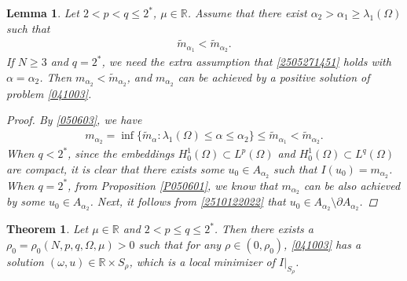 \documentclass[10pt,a4paper]{amsart}
\newtheorem{theorem}{Theorem}
\newtheorem{lemma}{Lemma}
\begin{document}
\begin{lemma}\label{L050602}
Let $2<p<q\le 2^*$, $\mu\in \mathbb{R}$. Assume that there exist $\alpha_2>\alpha_1\ge\lambda_1(\Omega)$ such that 
\begin{equation}\label{050603}
\begin{aligned}
 \widetilde{m}_{\alpha_1}<\widetilde{m}_{\alpha_2}.
\end{aligned}
\end{equation}
If $N\ge 3$ and $q=2^*$, we need the extra assumption that \eqref{2505271451} holds with $\alpha= \alpha_2$. Then $m_{\alpha_2}<\widetilde{m}_{\alpha_2}$, and $m_{\alpha_2}$ can be achieved by a positive solution of problem \eqref{041003}.
\begin{proof}
By \eqref{050603}, we have
\begin{equation}\label{2510122022}
\begin{aligned}
m_{\alpha_2} = \inf\{\widetilde{m}_{\alpha}:\lambda_1(\Omega)\leq \alpha \leq \alpha_2\}
\leq \widetilde{m}_{\alpha_1}
<\widetilde{m}_{\alpha_2}.
\end{aligned}
\end{equation}
When $q<2^*$, since  the embeddings $H_0^1(\Omega)\subset L^p(\Omega)$ and $H_0^1(\Omega)\subset L^q(\Omega)$ are compact, it is clear that there exists some $u_0\in A_{\alpha_2}$ such that $I(u_0)=m_{\alpha_2}$. When $q=2^*$, from Proposition \ref{P050601}, we know that $m_{\alpha_2}$ can  be also achieved by some $u_0\in A_{\alpha_2}$. Next, it follows from \eqref{2510122022} that $u_0\in A_{\alpha_2}\setminus \partial A_{\alpha_2}$.
\end{proof}
\end{lemma}

\begin{theorem}\label{T041801}
Let $\mu\in \mathbb{R}$ and $2<p\le q\le  2^*$. Then there exists a $\rho_0=\rho_0(N,p,q,\Omega,\mu)>0$ such that
 for any $\rho\in(0,\rho_0)$,  \eqref{041003} has a solution $(\omega, u)\in\mathbb{R}\times S_\rho$, which is a local minimizer of $I|_{S_\rho}$.
\end{theorem}
\end{document}
